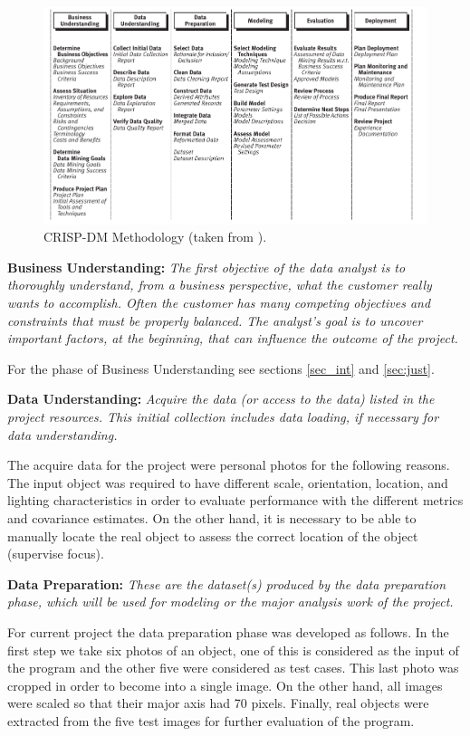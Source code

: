 \documentclass[11pt]{article}
\theoremstyle{definition}
\theoremstyle{remark}
\theoremstyle{remark}
\theoremstyle{remark}
\begin{document}
\begin{figure}[H]
    \centering
    \includegraphics[width = 0.8\linewidth]{crisp-dm.png}
    \caption{CRISP-DM Methodology (taken from \cite{Chapman2000CRISPDM1S}).}
    \label{fig:crisp-dm}
\end{figure}

\textbf{Business Understanding:} \textit{The first objective of the data analyst is to thoroughly understand, from a business perspective, what the
customer really wants to accomplish. Often the customer has many competing objectives and constraints
that must be properly balanced. The analyst’s goal is to uncover important factors, at the beginning, that
can influence the outcome of the project.}

For the phase of Business Understanding see sections \ref{sec_int} and \ref{sec:just}.

\textbf{Data Understanding:} \textit{Acquire the data (or access to the data) listed in the project resources. This initial collection includes data loading, if necessary for data understanding.}

The acquire data for the project were personal photos for the following reasons.
The input object was required to have different scale, orientation, location, and lighting characteristics in order to evaluate performance with the different metrics and covariance estimates. On the other hand, it is necessary to be able to manually locate the real object to assess the correct location of the object (supervise focus).

\textbf{Data Preparation:} \textit{These are the dataset(s) produced by the data preparation phase, which will be used for modeling or the
major analysis work of the project.}

For current project the data preparation phase was developed as follows. In the first step we take six photos of an object, one of this is considered as the input of the program and the other five were considered as test cases. This last photo was cropped in order to become into a single image. On the other hand, all images were scaled so that their major axis had 70 pixels. Finally, real objects were extracted from the five test images for further evaluation of the program.
\end{document}
